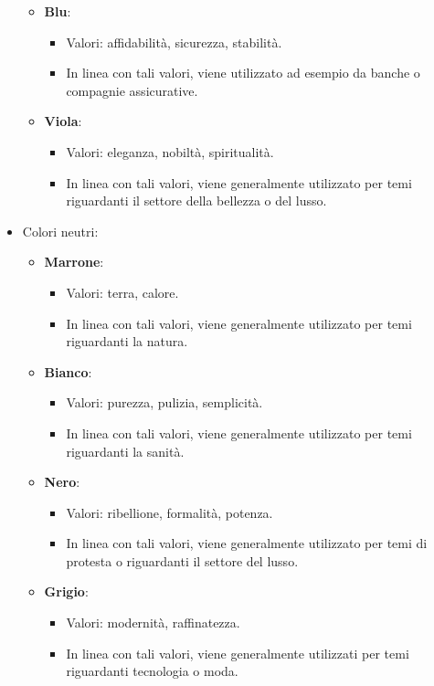 \begin{itemize}
\begin{itemize}
        \item \textbf{Blu}:
        \begin{itemize}
            \item Valori: affidabilità, sicurezza, stabilità.
            \item In linea con tali valori, viene utilizzato ad esempio da banche o compagnie assicurative.
        \end{itemize}
        \item \textbf{Viola}:
        \begin{itemize}
            \item Valori: eleganza, nobiltà, spiritualità.
            \item In linea con tali valori, viene generalmente utilizzato per temi riguardanti il settore della bellezza o del lusso.
        \end{itemize}
    \end{itemize}
    \item Colori neutri:
    \begin{itemize}
        \item \textbf{Marrone}:
        \begin{itemize}
            \item Valori: terra, calore.
            \item In linea con tali valori, viene generalmente utilizzato per temi riguardanti la natura.
        \end{itemize}
        \item \textbf{Bianco}:
        \begin{itemize}
            \item Valori: purezza, pulizia, semplicità.
            \item In linea con tali valori, viene generalmente utilizzato per temi riguardanti la sanità.
        \end{itemize}
        \item \textbf{Nero}:
        \begin{itemize}
            \item Valori: ribellione, formalità, potenza.
            \item In linea con tali valori, viene generalmente utilizzato per temi di protesta o riguardanti il settore del lusso.
        \end{itemize}
        \item \textbf{Grigio}:
        \begin{itemize}
            \item Valori: modernità, raffinatezza.
            \item In linea con tali valori, viene generalmente utilizzati per temi riguardanti tecnologia o moda.
        \end{itemize}
    \end{itemize}
\end{itemize}

